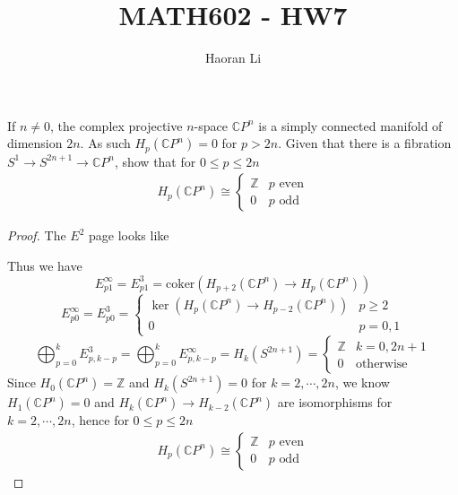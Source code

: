 \documentclass{article}
\title{MATH602 - HW7}
\author{Haoran Li}
\date{}
\newenvironment{exercise}[2][Exercise]{\begin{trivlist}
\item[\hskip \labelsep {\bfseries #1}\hskip \labelsep {\bfseries #2.}]}{\end{trivlist}}
\theoremstyle{definition}
\theoremstyle{remark}
\theoremstyle{definition}
\begin{document}
\sloppy %

\maketitle
\begin{exercise}{\textbf{5.3.2}}
If $n\neq0$, the complex projective $n$-space $\mathbb CP^n$ is a simply connected manifold of dimension $2n$. As such $H_p(\mathbb CP^n)=0$ for $p>2n$. Given that there is a fibration $S^1\to S^{2n+1}\to\mathbb CP^n$, show that for $0\leq p\leq 2n$
\begin{align*}
H_p(\mathbb CP^n)\cong\begin{cases}
\mathbb Z &p\text{ even} \\
0 &p\text{ odd}
\end{cases}
\end{align*}
\end{exercise}

\begin{proof}
The $E^2$ page looks like
\begin{center}
\end{center}
Thus we have
\[E^\infty_{p1}=E^3_{p1}=\mathrm{coker}(H_{p+2}(\mathbb CP^n)\to H_{p}(\mathbb CP^n))\]
\[E^\infty_{p0}=E^3_{p0}=\begin{cases}
\ker(H_p(\mathbb CP^n)\to H_{p-2}(\mathbb CP^n)) &p\geq2 \\
0 &p=0,1
\end{cases}\]
\[\bigoplus_{p=0}^{k}E^3_{p,k-p}=\bigoplus_{p=0}^{k}E^\infty_{p,k-p}=H_k(S^{2n+1})=\begin{cases}
\mathbb Z &k=0,2n+1 \\
0 &\text{otherwise}
\end{cases}\]
Since $H_0(\mathbb CP^n)=\mathbb Z$ and $H_k(S^{2n+1})=0$ for $k=2,\cdots,2n$, we know $H_1(\mathbb CP^n)=0$ and $H_{k}(\mathbb CP^n)\to H_{k-2}(\mathbb CP^n)$ are isomorphisms for $k=2,\cdots,2n$, hence for $0\leq p\leq2n$
\begin{align*}
H_p(\mathbb CP^n)\cong\begin{cases}
\mathbb Z &p\text{ even} \\
0 &p\text{ odd}
\end{cases}
\end{align*}
\end{proof}
\end{document}
